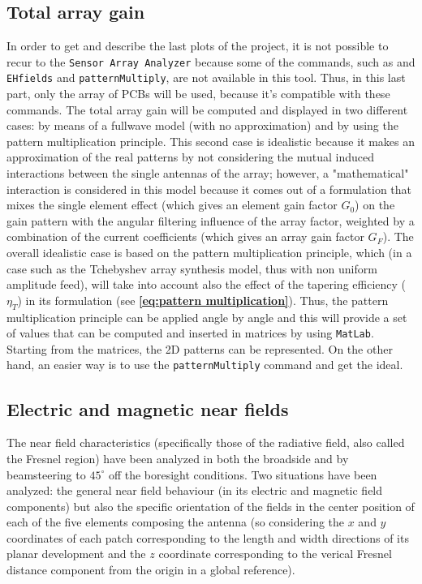 \documentclass[12pt,a4paper,twocolumn]{article}
\begin{document}
{\subsection*{\selectfont\color{Turquoise}Total array gain}
In order to get and describe the last plots of the project, it is not possible to recur to the \texttt{\color{Mahogany}Sensor Array Analyzer} because some of the commands, such as  and \texttt{\color{Turquoise}EHfields} and \texttt{\color{Turquoise}patternMultiply}, are not available in this tool. Thus, in this last part, only the array of PCBs will be used, because it's compatible with these commands. The total array gain will be computed and displayed in two different cases: by means of a fullwave model (with no approximation) and by using the pattern multiplication principle. This second case is idealistic because it makes an approximation of the real patterns by not considering the mutual induced interactions between the single antennas of the array; however, a "mathematical" interaction is considered in this model because it comes out of a formulation that mixes the single element effect (which gives an element gain factor $G_0$) on the gain pattern with the angular filtering influence of the array factor, weighted by a combination of the current coefficients (which gives an array gain factor $G_F$). The overall idealistic case is based on the pattern multiplication principle, which (in a case such as the Tchebyshev array synthesis model, thus with non uniform amplitude feed), will take into account also the effect of the tapering efficiency ($\eta_T$) in its formulation (see \textbf{\cref{eq:pattern multiplication}}). Thus, the pattern multiplication principle can be applied angle by angle and this will provide a set of values that can be computed and inserted in matrices by using \texttt{\color{BurntOrange}MatLab}. Starting from the matrices, the 2D patterns can be represented. On the other hand, an easier way is to use the \texttt{\color{Turquoise}patternMultiply} command and get the ideal. 
\subsection*{\selectfont\color{Turquoise}Electric and magnetic near fields}
The near field characteristics (specifically those of the radiative field, also called the Fresnel region) have been analyzed in both the broadside and by beamsteering to $45^\circ$ off the boresight conditions. Two situations have been analyzed: the general near field behaviour (in its electric and magnetic field components) but also the specific orientation of the fields in the center position of each of the five elements composing the antenna (so considering the $x$ and $y$ coordinates of each patch corresponding to the length and width directions of its planar development and the $z$ coordinate corresponding to the verical Fresnel distance component from the origin in a global reference). 

}
\end{document}

